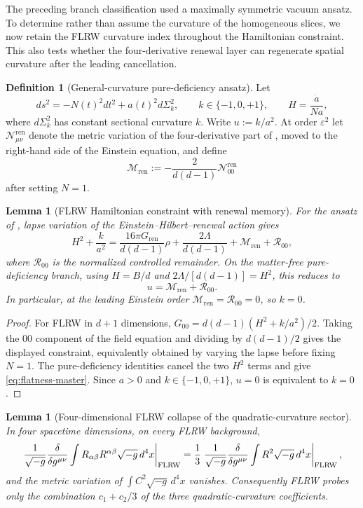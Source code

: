 \documentclass[11pt]{article}
\newtheorem{lemma}[theorem]{Lemma}
\theoremstyle{definition}
\newtheorem{definition}[theorem]{Definition}
\theoremstyle{remark}
\newcommand{\eps}{\varepsilon}
\newcommand{\ren}{\mathrm{ren}}
\newcommand{\Mren}{\mathcal M_{\mathrm{ren}}}
\newcommand{\Gren}{G_{\mathrm{ren}}}
\begin{document}
The preceding branch classification used a maximally symmetric vacuum ansatz.
To determine rather than assume the curvature of the homogeneous slices, we now
retain the FLRW curvature index throughout the Hamiltonian constraint.  This
also tests whether the four-derivative renewal layer can regenerate spatial
curvature after the leading cancellation.

\begin{definition}[General-curvature pure-deficiency ansatz]
\label{def:general-curvature-flrw}
Let
\[
 ds^2=-N(t)^2dt^2+a(t)^2d\Sigma_k^2,\qquad
 k\in\{-1,0,+1\},\qquad H=\frac{\dot a}{Na},
\]
where $d\Sigma_k^2$ has constant sectional curvature $k$.  Write
$u:=k/a^2$.  At order $\eps^2$ let $\mathcal N^{\ren}_{\mu\nu}$ denote
the metric variation of the four-derivative part of
, moved to the right-hand side of the Einstein
equation, and define
\[
 \Mren:=-\frac{2}{d(d-1)}\mathcal N^{\ren}_{00}
\]
after setting $N=1$.
\end{definition}

\begin{lemma}[FLRW Hamiltonian constraint with renewal memory]
\label{lem:flrw-renewal-constraint}
For the ansatz of , lapse variation of the
Einstein--Hilbert--renewal action gives
\[
 H^2+\frac{k}{a^2}
 =\frac{16\pi\Gren}{d(d-1)}\rho
  +\frac{2\Lambda}{d(d-1)}+\Mren+\mathcal R_{00},
\]
where $\mathcal R_{00}$ is the normalized controlled remainder.  On the
matter-free pure-deficiency branch, using $H=B/d$ and
$2\Lambda/[d(d-1)]=H^2$, this reduces to
\begin{equation}
\label{eq:flatness-master}
  u=\Mren+\mathcal R_{00}.
\end{equation}
In particular, at the leading Einstein order $\Mren=\mathcal R_{00}=0$,
so $k=0$.
\end{lemma}

\begin{proof}
For FLRW in $d+1$ dimensions,
$G_{00}=d(d-1)(H^2+k/a^2)/2$.  Taking the $00$ component of the field equation
and dividing by $d(d-1)/2$ gives the displayed constraint, equivalently obtained
by varying the lapse before fixing $N=1$.  The pure-deficiency identities cancel
the two $H^2$ terms and give \eqref{eq:flatness-master}.  Since $a>0$ and
$k\in\{-1,0,+1\}$, $u=0$ is equivalent to $k=0$.
\end{proof}

\begin{lemma}[Four-dimensional FLRW collapse of the quadratic-curvature sector]
\label{lem:flrw-quadratic-collapse}
In four spacetime dimensions, on every FLRW background,
\[
 \left.\frac{1}{\sqrt{-g}}\frac{\delta}{\delta g^{\mu\nu}}
 \int R_{\alpha\beta}R^{\alpha\beta}\sqrt{-g}\,d^4x
 \right|_{\rm FLRW}
 =\frac13
 \left.\frac{1}{\sqrt{-g}}\frac{\delta}{\delta g^{\mu\nu}}
 \int R^2\sqrt{-g}\,d^4x\right|_{\rm FLRW},
\]
and the metric variation of $\int C^2\sqrt{-g}\,d^4x$ vanishes.
Consequently FLRW probes only the combination $c_1+c_2/3$ of the three
quadratic-curvature coefficients.
\end{lemma}
\end{document}
